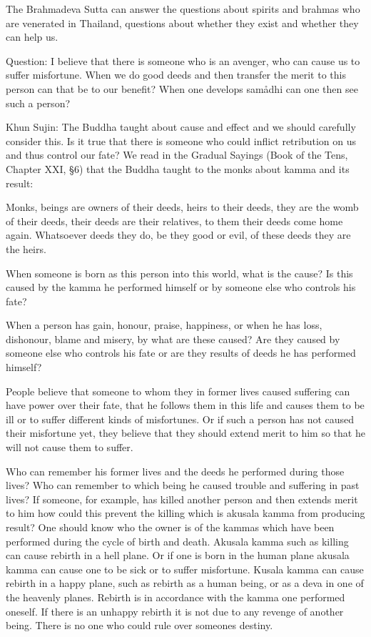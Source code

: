 \documentclass[12pt,twoside]{article}
\begin{document}
The Brahmadeva Sutta can answer the questions about spirits and brahmas
who are venerated in Thailand, questions about whether they exist and
whether they can help us. 

Question: I believe that there is someone who is an avenger, who can
cause us to suffer misfortune. When we do good deeds and then transfer
the merit to this person can that be to our benefit? When one develops
sam{\aa}dhi can one then see such a person?

Khun Sujin: The Buddha taught about cause and effect and we should
carefully consider this. Is it true that there is someone who could
inflict retribution on us and thus control our fate? We read in the
Gradual Sayings (Book of the Tens, Chapter XXI, {\S}6) that the Buddha
taught to the monks about kamma and its result:


\bigskip

Monks, beings are owners of their deeds, heirs to their deeds, they are
the womb of their deeds, their deeds are their relatives, to them their
deeds come home again. Whatsoever deeds they do, be they good or evil,
of these deeds they are the heirs. 


\bigskip

When someone is born as this person into this world, what is the cause?
Is this caused by the kamma he performed himself or by someone else who
controls his fate?

When a person has gain, honour, praise, happiness, or when he has loss,
dishonour, blame and misery, by what are these caused? Are they caused
by someone else who controls his fate or are they results of deeds he
has performed himself?

People believe that someone to whom they in former lives caused
suffering can have power over their fate, that he follows them in this
life and causes them to be ill or to suffer different kinds of
misfortunes. Or if such a person has not caused their misfortune yet,
they believe that they should extend merit to him so that he will not
cause them to suffer. 

Who can remember his former lives and the deeds he performed during
those lives? Who can remember to which being he caused trouble and
suffering in past lives? If someone, for example, has killed another
person and then extends merit to him how could this prevent the killing
which is akusala kamma from producing result? One should know who the
owner is of the kammas which have been performed during the cycle of
birth and death. Akusala kamma such as killing can cause rebirth in a
hell plane. Or if one is born in the human plane akusala kamma can
cause one to be sick or to suffer misfortune. Kusala kamma can cause
rebirth in a happy plane, such as rebirth as a human being, or as a
deva in one of the heavenly planes. Rebirth is in accordance with the
kamma one performed oneself. If there is an unhappy rebirth it is not
due to any revenge of another being. There is no one who could rule
over someone{\textquotesingle}s destiny. 
\end{document}
